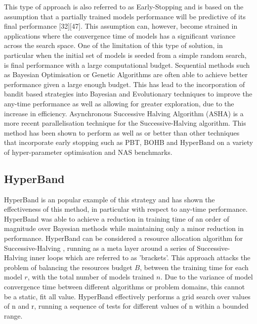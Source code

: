 		This type of approach is also referred to as Early-Stopping and is based on the assumption that a partially trained models performance will be predictive of its final performance [32][47]. This assumption can, however, become strained in applications where the convergence time of models has a significant variance across the search space. One of the limitation of this type of solution, in particular when the initial set of models is seeded from a simple random search, is final performance with a large computational budget.  Sequential methods such as Bayesian Optimisation or Genetic Algorithms are often able to achieve better performance given a large enough budget. This has lead to the incorporation of bandit based strategies into Bayesian and Evolutionary techniques to improve the any-time performance as well as allowing for greater exploration, due to the increase in efficiency. \cite{32,34,39}  Asynchronous Successive Halving Algorithm (ASHA) \cite{34} is a more recent parallelisation technique for the Successive-Halving algorithm. This method has been shown to perform as well as or better than other techniques that incorporate early stopping such as PBT, BOHB and HyperBand on a variety of hyper-parameter optimisation and NAS benchmarks.



	\subsection{HyperBand}

		HyperBand \cite{HB} is an popular example of this strategy and has shown the effectiveness of this method, in particular with respect to any-time performance. HyperBand was able to achieve a reduction in training time of an order of magnitude over Bayesian methods while maintaining only a minor reduction in performance. HyperBand can be considered a resource allocation algorithm for Successive-Halving \cite{SH}, running as a meta layer around a series of Successive-Halving inner loops which are referred to as 'brackets'. This approach attacks the problem of balancing the resources budget \(B\), between the training time for each model \(r\), with the total number of models trained \(n\). Due to the variance of model convergence time between different algorithms or problem domains, this cannot be a static, fit all value. HyperBand effectively performs a grid search over values of n and r, running a sequence of tests for different values of n within a bounded range. 



